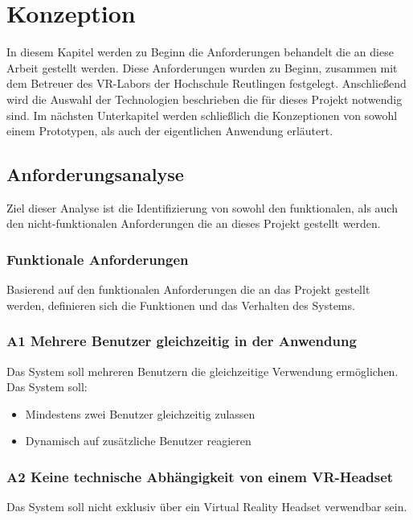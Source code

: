 \section{Konzeption} \label{Konzeption}
In diesem Kapitel werden zu Beginn die Anforderungen behandelt die an diese Arbeit gestellt werden. Diese Anforderungen wurden zu Beginn, zusammen mit dem Betreuer des VR-Labors der Hochschule Reutlingen festgelegt. Anschließend wird die Auswahl der Technologien beschrieben die für dieses Projekt notwendig sind. Im nächsten Unterkapitel werden schließlich die Konzeptionen von sowohl einem Prototypen, als auch der eigentlichen Anwendung erläutert.  

\subsection{Anforderungsanalyse}
Ziel dieser Analyse ist die Identifizierung von sowohl den funktionalen, als auch den nicht-funktionalen Anforderungen die an dieses Projekt gestellt werden. 

\subsubsection{Funktionale Anforderungen}
Basierend auf den funktionalen Anforderungen die an das Projekt gestellt werden, definieren sich die Funktionen und das Verhalten des Systems.

\subsubsection*{A1 Mehrere Benutzer gleichzeitig in der Anwendung \label{A1}}

Das System soll mehreren Benutzern die gleichzeitige Verwendung ermöglichen.\\

Das System soll: 
\begin{itemize}
\item Mindestens zwei Benutzer gleichzeitig zulassen
\item Dynamisch auf zusätzliche Benutzer reagieren
\end{itemize}

	
\subsubsection*{A2 \label{A2} Keine technische Abhängigkeit von einem VR-Headset}
Das System soll nicht exklusiv über ein Virtual Reality Headset verwendbar sein.\\

